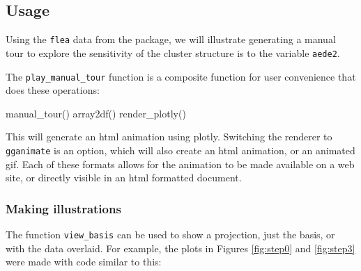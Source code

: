 \hypertarget{usage}{%
\subsection{Usage}\label{usage}}

Using the \texttt{flea} data from the  package, we will
illustrate generating a manual tour to explore the sensitivity of the
cluster structure is to the variable \texttt{aede2}.

\begin{Schunk}
\end{Schunk}

The \texttt{play\_manual\_tour} function is a composite function for
user convenience that does these operations:

\begin{Schunk}
\begin{Sinput}
manual_tour()
array2df()
render_plotly()
\end{Sinput}
\end{Schunk}

\noindent This will generate an html animation using plotly. Switching
the renderer to \texttt{gganimate} is an option, which will also create
an html animation, or an animated gif. Each of these formats allows for
the animation to be made available on a web site, or directly visible in
an html formatted document.

\hypertarget{making-illustrations}{%
\subsubsection{Making illustrations}\label{making-illustrations}}

The function \texttt{view\_basis} can be used to show a projection, just
the basis, or with the data overlaid. For example, the plots in Figures
\ref{fig:step0} and \ref{fig:step3} were made with code similar to this:

